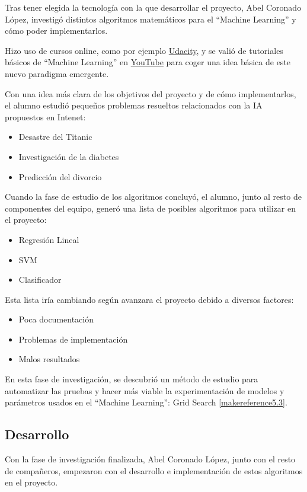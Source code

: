 Tras tener elegida la tecnología con la que desarrollar el proyecto, Abel Coronado López, investigó distintos algoritmos matemáticos para el ``Machine Learning'' y cómo poder implementarlos.

Hizo uso de cursos online, como por ejemplo \href{https://www.udacity.com}{Udacity}, y se valió de tutoriales básicos de ``Machine Learning'' en \href{https://www.youtube.com}{YouTube} para coger una idea básica de este nuevo paradigma emergente.

Con una idea más clara de los objetivos del proyecto y de cómo implementarlos, el alumno estudió pequeños problemas resueltos relacionados con la IA propuestos en Intenet:

\begin{itemize}
\item Desastre del Titanic
\item Investigación de la diabetes
\item Predicción del divorcio
\end{itemize}

Cuando la fase de estudio de los algoritmos concluyó, el alumno, junto al resto de componentes del equipo, generó una lista de posibles algoritmos para utilizar en el proyecto: 

\begin{itemize}
\item Regresión Lineal
\item SVM
\item Clasificador
\end{itemize}

Esta lista iría cambiando según avanzara el proyecto debido a diversos factores:

\begin{itemize}
\item Poca documentación
\item Problemas de implementación
\item Malos resultados
\end{itemize}

En esta fase de investigación, se descubrió un método de estudio para automatizar las pruebas y hacer más viable la experimentación de modelos y parámetros usados en el ``Machine Learning'': Grid Search \ref{makereference5.3}.

\subsection{Desarrollo}
Con la fase de investigación finalizada, Abel Coronado López, junto con el resto de compañeros, empezaron con el desarrollo e implementación de estos algoritmos en el proyecto.

